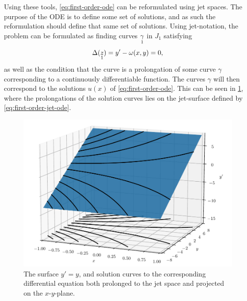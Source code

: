 Using these tools, \cref{eq:first-order-ode} can be reformulated using jet spaces.
The purpose of the ODE is to define some set of solutions, and as such the reformulation should define that same set of solutions.
Using jet-notation, the problem can be formulated as finding curves \(\prolong{\gamma}{1}\) in \(J_1\) satisfying
\begin{equation} \label{eq:first-order-jet-ode}
  \Delta(\prolong{z}{1}) = y' - \omega(x,y) = 0,
\end{equation}
as well as the condition that the curve is a prolongation of some curve \(\gamma\) corresponding to a continuously differentiable function.
The curves \(\gamma\) will then correspond to the solutions \(u(x)\) of \cref{eq:first-order-ode}.
This can be seen in \cref{fig:jet-surface}, where the prolongations of the solution curves lies on the jet-surface defined by \cref{eq:first-order-jet-ode}.
\begin{figure}
  \centering
  \includegraphics[width=.96\textwidth]{images/jet-surface}
  \caption{The surface \(y' = y\), and solution curves to the corresponding differential equation both prolonged to the jet space and projected on the \(x\)-\(y\)-plane.}
  \label{fig:jet-surface}
\end{figure}

